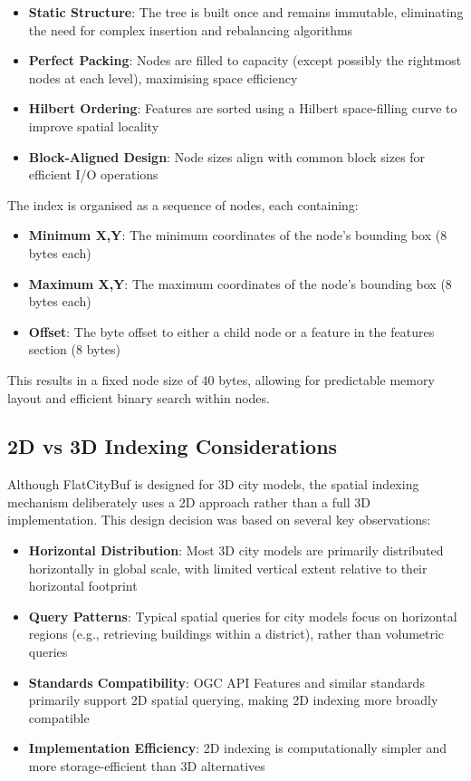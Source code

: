 \begin{itemize}
    \item \textbf{Static Structure}: The tree is built once and remains immutable, eliminating the need for complex insertion and rebalancing algorithms
    \item \textbf{Perfect Packing}: Nodes are filled to capacity (except possibly the rightmost nodes at each level), maximising space efficiency
    \item \textbf{Hilbert Ordering}: Features are sorted using a Hilbert space-filling curve to improve spatial locality
    \item \textbf{Block-Aligned Design}: Node sizes align with common block sizes for efficient I/O operations
\end{itemize}

The index is organised as a sequence of nodes, each containing:

\begin{itemize}
    \item \textbf{Minimum X,Y}: The minimum coordinates of the node's bounding box (8 bytes each)
    \item \textbf{Maximum X,Y}: The maximum coordinates of the node's bounding box (8 bytes each)
    \item \textbf{Offset}: The byte offset to either a child node or a feature in the features section (8 bytes)
\end{itemize}

This results in a fixed node size of 40 bytes, allowing for predictable memory layout and efficient binary search within nodes.

\subsection{2D vs 3D Indexing Considerations}
\label{methodology:spatial_index:2d_vs_3d_indexing}

Although FlatCityBuf is designed for 3D city models, the spatial indexing mechanism deliberately uses a 2D approach rather than a full 3D implementation. This design decision was based on several key observations:

\begin{itemize}
    \item \textbf{Horizontal Distribution}: Most 3D city models are primarily distributed horizontally in global scale, with limited vertical extent relative to their horizontal footprint
    \item \textbf{Query Patterns}: Typical spatial queries for city models focus on horizontal regions (e.g., retrieving buildings within a district), rather than volumetric queries
    \item \textbf{Standards Compatibility}: OGC API Features and similar standards primarily support 2D spatial querying, making 2D indexing more broadly compatible
    \item \textbf{Implementation Efficiency}: 2D indexing is computationally simpler and more storage-efficient than 3D alternatives
\end{itemize}

